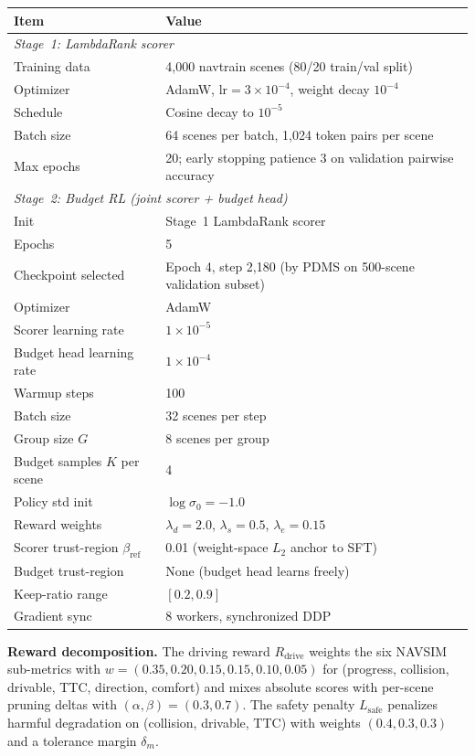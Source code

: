 \documentclass[letterpaper]{article}
\begin{document}
\begin{center}
\begin{tabular}{@{}ll@{}}
\toprule
Item & Value \\
\midrule
\multicolumn{2}{l}{\emph{Stage~1: LambdaRank scorer}} \\
Training data & 4,000 navtrain scenes (80/20 train/val split) \\
Optimizer & AdamW, $\mathrm{lr}=3\times10^{-4}$, weight decay $10^{-4}$ \\
Schedule & Cosine decay to $10^{-5}$ \\
Batch size & 64 scenes per batch, 1,024 token pairs per scene \\
Max epochs & 20; early stopping patience 3 on validation pairwise accuracy \\
\cmidrule(lr){1-2}
\multicolumn{2}{l}{\emph{Stage~2: Budget RL (joint scorer + budget head)}} \\
Init & Stage~1 LambdaRank scorer \\
Epochs & 5 \\
Checkpoint selected & Epoch 4, step 2,180 (by PDMS on 500-scene validation subset) \\
Optimizer & AdamW \\
Scorer learning rate & $1\times10^{-5}$ \\
Budget head learning rate & $1\times10^{-4}$ \\
Warmup steps & 100 \\
Batch size & 32 scenes per step \\
Group size $G$ & 8 scenes per group \\
Budget samples $K$ per scene & 4 \\
Policy std init & $\log\sigma_0 = -1.0$ \\
Reward weights & $\lambda_d{=}2.0$, $\lambda_s{=}0.5$, $\lambda_e{=}0.15$ \\
Scorer trust-region $\beta_{\mathrm{ref}}$ & 0.01 (weight-space $L_2$ anchor to SFT) \\
Budget trust-region & None (budget head learns freely) \\
Keep-ratio range & $[0.2, 0.9]$ \\
Gradient sync & 8 workers, synchronized DDP \\
\bottomrule
\end{tabular}
\end{center}

\textbf{Reward decomposition.} The driving reward $R_{\mathrm{drive}}$ weights the six NAVSIM
sub-metrics with $w{=}(0.35,0.20,0.15,0.15,0.10,0.05)$ for (progress, collision, drivable, TTC,
direction, comfort) and mixes absolute scores with per-scene pruning deltas with
$(\alpha,\beta)=(0.3,0.7)$. The safety penalty $L_{\mathrm{safe}}$ penalizes harmful degradation
on (collision, drivable, TTC) with weights $(0.4,0.3,0.3)$ and a tolerance margin $\delta_m$.
\end{document}
